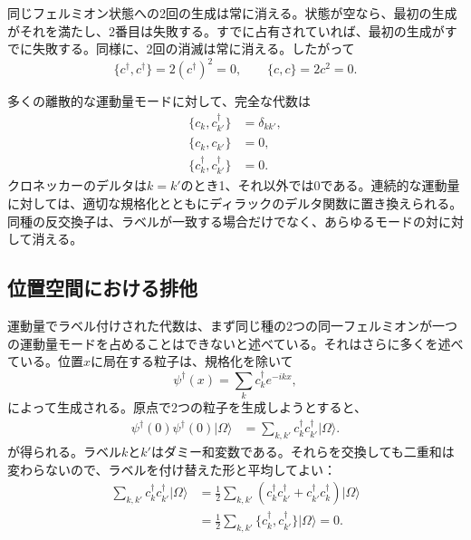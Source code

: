 同じフェルミオン状態への2回の生成は常に消える。状態が空なら、最初の生成がそれを満たし、2番目は失敗する。すでに占有されていれば、最初の生成がすでに失敗する。同様に、2回の消滅は常に消える。したがって
\begin{equation}
\{c^\dagger,c^\dagger\}=2(c^\dagger)^2=0,
\qquad
\{c,c\}=2c^2=0.
\end{equation}

\begin{classroomqa}
\end{classroomqa}

多くの離散的な運動量モードに対して、完全な代数は
\begin{align}
\{c_k,c_{k'}^\dagger\}&=\delta_{kk'},
\\
\{c_k,c_{k'}\}&=0,
\\
\{c_k^\dagger,c_{k'}^\dagger\}&=0.
\end{align}
クロネッカーのデルタは\(k=k'\)のとき1、それ以外では0である。連続的な運動量に対しては、適切な規格化とともにディラックのデルタ関数に置き換えられる。同種の反交換子は、ラベルが一致する場合だけでなく、あらゆるモードの対に対して消える。

\subsection{位置空間における排他}

運動量でラベル付けされた代数は、まず同じ種の2つの同一フェルミオンが一つの運動量モードを占めることはできないと述べている。それはさらに多くを述べている。位置\(x\)に局在する粒子は、規格化を除いて
\begin{equation}
\psi^\dagger(x)=\sum_k c_k^\dagger e^{-ikx},
\end{equation}
によって生成される。原点で2つの粒子を生成しようとすると、
\begin{align}
\psi^\dagger(0)\psi^\dagger(0)|\Omega\rangle
&=\sum_{k,k'}c_k^\dagger c_{k'}^\dagger|\Omega\rangle.
\end{align}
が得られる。ラベル\(k\)と\(k'\)はダミー和変数である。それらを交換しても二重和は変わらないので、ラベルを付け替えた形と平均してよい：
\begin{align}
\sum_{k,k'}c_k^\dagger c_{k'}^\dagger|\Omega\rangle
&=\frac12\sum_{k,k'}
\left(c_k^\dagger c_{k'}^\dagger
+c_{k'}^\dagger c_k^\dagger\right)|\Omega\rangle
\\
&=\frac12\sum_{k,k'}
\{c_k^\dagger,c_{k'}^\dagger\}|\Omega\rangle
=0.
\end{align}

